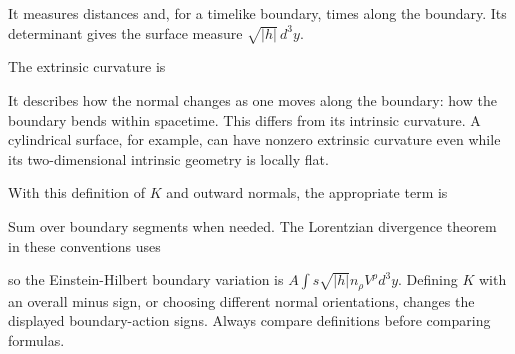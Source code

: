 \documentclass[
  11pt,
  letterpaper,
  oneside,
  openany]{scrbook}
\begin{document}
\begin{center}
\begingroup
{}
\ifdim\wd\grmathbox>\linewidth
\resizebox{\linewidth}{!}{\usebox{\grmathbox}}
\else\usebox{\grmathbox}\fi
\endgroup
\end{center}

It measures distances and, for a timelike boundary, times along the
boundary. Its determinant gives the surface measure
\(\sqrt{|h|}\,d^3y\).

The extrinsic curvature is

\begin{center}
\begingroup
{}
\ifdim\wd\grmathbox>\linewidth
\resizebox{\linewidth}{!}{\usebox{\grmathbox}}
\else\usebox{\grmathbox}\fi
\endgroup
\end{center}

It describes how the normal changes as one moves along the boundary: how
the boundary bends within spacetime. This differs from its intrinsic
curvature. A cylindrical surface, for example, can have nonzero
extrinsic curvature even while its two-dimensional intrinsic geometry is
locally flat.

With this definition of \(K\) and outward normals, the appropriate term
is

\begin{center}
\begingroup
{}
\ifdim\wd\grmathbox>\linewidth
\resizebox{\linewidth}{!}{\usebox{\grmathbox}}
\else\usebox{\grmathbox}\fi
\endgroup
\end{center}

Sum over boundary segments when needed. The Lorentzian divergence
theorem in these conventions uses

\begin{center}
\begingroup
{}
\ifdim\wd\grmathbox>\linewidth
\resizebox{\linewidth}{!}{\usebox{\grmathbox}}
\else\usebox{\grmathbox}\fi
\endgroup
\end{center}

so the Einstein-Hilbert boundary variation is
\(A\int s\sqrt{|h|}n_\rho V^\rho d^3y\). Defining \(K\) with an overall
minus sign, or choosing different normal orientations, changes the
displayed boundary-action signs. Always compare definitions before
comparing formulas.
\end{document}
